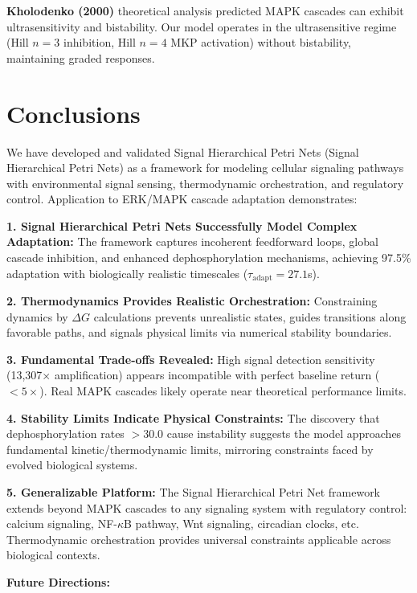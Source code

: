 \documentclass[twocolumn,11pt]{article}
\newcommand{\shpn}{Signal Hierarchical Petri Net}
\newcommand{\shpns}{Signal Hierarchical Petri Nets}
\newcommand{\mkp}{MKP}
\newcommand{\mapk}{MAPK}
\newcommand{\dg}{\Delta G}
\newcommand{\srr}{\text{SRR}}
\begin{document}
\textbf{Kholodenko (2000)} theoretical analysis predicted \mapk{} cascades can exhibit ultrasensitivity and bistability. Our model operates in the ultrasensitive regime (Hill $n=3$ inhibition, Hill $n=4$ \mkp{} activation) without bistability, maintaining graded responses.

\section{Conclusions}

We have developed and validated Signal Hierarchical Petri Nets (\shpns{}) as a framework for modeling cellular signaling pathways with environmental signal sensing, thermodynamic orchestration, and regulatory control. Application to ERK/MAPK cascade adaptation demonstrates:

\textbf{1. \shpns{} Successfully Model Complex Adaptation:} The framework captures incoherent feedforward loops, global cascade inhibition, and enhanced dephosphorylation mechanisms, achieving 97.5\% adaptation with biologically realistic timescales ($\tau_{\text{adapt}} = 27.1$s).

\textbf{2. Thermodynamics Provides Realistic Orchestration:} Constraining dynamics by $\dg{}$ calculations prevents unrealistic states, guides transitions along favorable paths, and signals physical limits via numerical stability boundaries.

\textbf{3. Fundamental Trade-offs Revealed:} High signal detection sensitivity (13,307$\times$ amplification) appears incompatible with perfect baseline return (\srr{} $<5\times$). Real \mapk{} cascades likely operate near theoretical performance limits.

\textbf{4. Stability Limits Indicate Physical Constraints:} The discovery that dephosphorylation rates $>30.0$ cause instability suggests the model approaches fundamental kinetic/thermodynamic limits, mirroring constraints faced by evolved biological systems.

\textbf{5. Generalizable Platform:} The \shpn{} framework extends beyond \mapk{} cascades to any signaling system with regulatory control: calcium signaling, NF-$\kappa$B pathway, Wnt signaling, circadian clocks, etc. Thermodynamic orchestration provides universal constraints applicable across biological contexts.

\textbf{Future Directions:}
\end{document}
